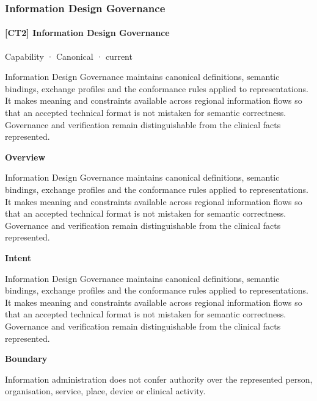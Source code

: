 \subsubsection{Information Design Governance}

\paragraph{[CT2] Information Design Governance}

\label{element:f39ed9ebcc724857a4bf7a2b8e045c7a}
{\small Capability · Canonical · current}\par

Information Design Governance maintains canonical definitions, semantic bindings, exchange profiles and the conformance rules applied to representations. It makes meaning and constraints available across regional information flows so that an accepted technical format is not mistaken for semantic correctness. Governance and verification remain distinguishable from the clinical facts represented.



\textbf{Overview}



Information Design Governance maintains canonical definitions, semantic bindings, exchange profiles and the conformance rules applied to representations. It makes meaning and constraints available across regional information flows so that an accepted technical format is not mistaken for semantic correctness. Governance and verification remain distinguishable from the clinical facts represented.



\textbf{Intent}



Information Design Governance maintains canonical definitions, semantic bindings, exchange profiles and the conformance rules applied to representations. It makes meaning and constraints available across regional information flows so that an accepted technical format is not mistaken for semantic correctness. Governance and verification remain distinguishable from the clinical facts represented.



\textbf{Boundary}



Information administration does not confer authority over the represented person, organisation, service, place, device or clinical activity.



